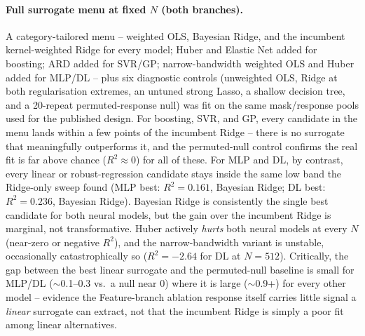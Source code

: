 \paragraph{Full surrogate menu at fixed $N$ (both branches).} A
category-tailored menu -- weighted OLS, Bayesian Ridge, and the incumbent
kernel-weighted Ridge for every model; Huber and Elastic Net added for
boosting; ARD added for SVR/GP; narrow-bandwidth weighted OLS and Huber added
for MLP/DL -- plus six diagnostic controls (unweighted OLS, Ridge at both
regularisation extremes, an untuned strong Lasso, a shallow decision tree,
and a 20-repeat permuted-response null) was fit on the same mask/response
pools used for the published design. For boosting, SVR, and GP, every
candidate in the menu lands within a few points of the incumbent Ridge --
there is no surrogate that meaningfully outperforms it, and the permuted-null
control confirms the real fit is far above chance ($R^2\approx0$) for all of
these. For MLP and DL, by contrast, every linear or robust-regression
candidate stays inside the same low band the Ridge-only sweep found (MLP
best: $R^2=0.161$, Bayesian Ridge; DL best: $R^2=0.236$, Bayesian Ridge).
Bayesian Ridge is consistently the single best candidate for both neural
models, but the gain over the incumbent Ridge is marginal, not
transformative. Huber actively \emph{hurts} both neural models at every $N$
(near-zero or negative $R^2$), and the narrow-bandwidth variant is unstable,
occasionally catastrophically so ($R^2=-2.64$ for DL at $N{=}512$). Critically,
the gap between the best linear surrogate and the permuted-null baseline is
small for MLP/DL ($\sim$0.1--0.3 vs.\ a null near 0) where it is large
($\sim$0.9+) for every other model -- evidence the Feature-branch ablation
response itself carries little signal a \emph{linear} surrogate can extract,
not that the incumbent Ridge is simply a poor fit among linear alternatives.

